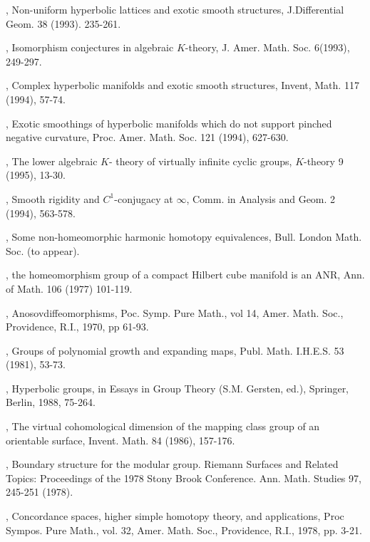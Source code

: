 \begin{thebibliography}{99}
, Non-uniform hyperbolic
  lattices and exotic smooth structures, J.Differential Geom. 38
  (1993). 235-261.

, Isomorphism conjectures in
  algebraic $K$-theory, J. Amer. Math. Soc. 6(1993), 249-297.

, Complex hyperbolic
  manifolds and exotic smooth structures, Invent, Math. 117 (1994),
  57-74. 

, Exotic smoothings of
  hyperbolic manifolds which do not support pinched negative
  curvature, Proc. Amer. Math. Soc. 121 (1994), 627-630.

, The lower algebraic $K$-
  theory of virtually infinite cyclic groups, $K$-theory 9 (1995), 13-30.

, Smooth rigidity and
  $C^1$-conjugacy at $\infty$, Comm. in Analysis and Geom. 2 (1994),
  563-578. 

, Some non-homeomorphic
  harmonic homotopy equivalences, Bull. London Math. Soc. (to appear).

, the homeomorphism group of a compact Hilbert
  cube manifold is an ANR, Ann. of Math. 106 (1977) 101-119.

, Anosov\pageoriginale diffeomorphisms,
  Poc. Symp. Pure Math., vol 14, Amer. Math. Soc., Providence, R.I.,
  1970, pp 61-93.

, Groups of polynomial growth and expanding
  maps, Publ. Math. I.H.E.S. 53 (1981), 53-73.

, Hyperbolic groups, in Essays in Group Theory
  (S.M. Gersten, ed.), Springer, Berlin, 1988, 75-264.

, The virtual cohomological dimension of the
  mapping class group of an orientable surface, Invent. Math. 84
  (1986), 157-176.

, Boundary structure for the modular
  group. Riemann Surfaces and Related Topics: Proceedings of the 1978
  Stony Brook Conference. Ann. Math. Studies 97, 245-251 (1978).

, Concordance spaces, higher simple homotopy
  theory, and applications, Proc Sympos. Pure Math., vol. 32,
  Amer. Math. Soc., Providence, R.I., 1978, pp. 3-21.


\end{thebibliography}
